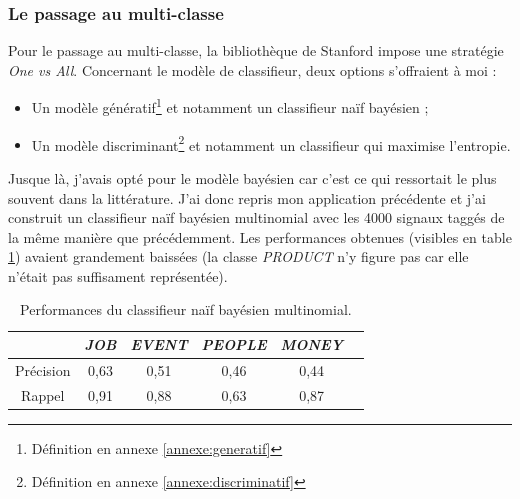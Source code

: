             \subsubsection{Le passage au multi-classe}
                Pour le passage au multi-classe, la bibliothèque de Stanford impose une stratégie \textit{One vs All}. Concernant le modèle de classifieur, deux options s'offraient à moi :
                \begin{itemize}
                    \item Un modèle génératif\footnote{Définition en annexe \ref{annexe:generatif}} et notamment un classifieur naïf bayésien ;
                    \item Un modèle discriminant\footnote{Définition en annexe \ref{annexe:discriminatif}} et notamment un classifieur qui maximise l'entropie.
                \end{itemize}
                Jusque là, j'avais opté pour le modèle bayésien car c'est ce qui ressortait le plus souvent dans la littérature. J'ai donc repris mon application précédente et j'ai construit un classifieur naïf bayésien multinomial avec les 4000 signaux taggés de la même manière que précédemment. Les performances obtenues (visibles en table \ref{tab:classif_perf2}) avaient grandement baissées (la classe \textit{PRODUCT} n'y figure pas car elle n'était pas suffisament représentée).
                \begin{table}[h]
                    \centering
                    \begin{tabular}{| c | c | c | c | c | c |}
                        \hline
                         & \textit{JOB} & \textit{EVENT} & \textit{PEOPLE} & \textit{MONEY} \\
                        \hline
                        Précision & 0,63 & 0,51 & 0,46 & 0,44 \\
                        Rappel & 0,91 & 0,88 & 0,63 & 0,87 \\
                        \hline
                    \end{tabular}
                    \caption{Performances du classifieur naïf bayésien multinomial.}
                    \label{tab:classif_perf2}
                \end{table}

